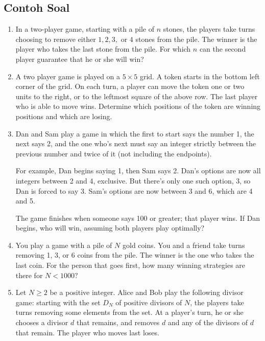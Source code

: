 \documentclass[11pt]{scrartcl}
\begin{document}
\subsection{Contoh Soal}
\begin{enumerate}
    \item In a two-player game, starting with a pile of $ n $ stones, the players take turns choosing to remove either $ 1,2,3, $ or $ 4 $ stones from the pile. The winner is the player who takes the last stone from the pile. For which $ n $ can the second player guarantee that he or she will win?

    \item A two player game is played on a $5 \times 5$ grid. A token starts in the bottom left corner of the grid. On each turn, a player can move the token one or two units to the right, or to the leftmost square of the above row. The last player who is able to move wins. Determine which positions of the token are winning positions and which are losing.

    \item Dan and Sam play a game in which the first to start says the number 1, the next says 2, and the one who's next must say an integer strictly between the previous number and twice of it (not including the endpoints).
    
    For example, Dan begins saying 1, then Sam says 2. Dan's options are now all integers between 2 and 4, exclusive. But there's only one such option, 3, so Dan is forced to say 3. Sam's options are now between 3 and 6, which are 4 and 5.
    
    The game finishes when someone says 100 or greater; that player wins. If Dan begins, who will win, assuming both players play optimally?


    \item You play a game with a pile of $N$ gold coins. You and a friend take turns removing 1, 3, or 6 coins from the pile. The winner is the one who takes the last coin. For the person that goes first, how many winning strategies are there for $N < 1000?$

    \item Let $ N \ge 2 $ be a positive integer. Alice and Bob play the following divisor game: starting with the set $ D_N $ of positive divisors of $ N$, the players take turns removing some elements from the set. At a player's turn, he or she chooses a divisor $ d $ that remains, and removes $ d $ and any of the divisors of $ d $ that remain. The player who moves last loses.
    

\end{enumerate}
\end{document}
